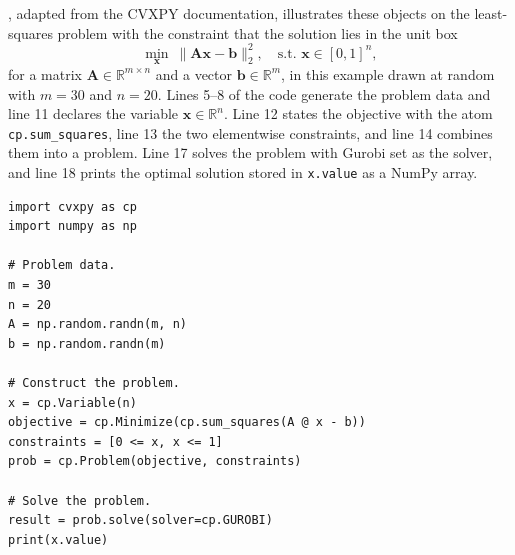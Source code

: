 , adapted from the CVXPY documentation, illustrates these objects on the least-squares
problem with the constraint that the solution lies in the unit box
\begin{equation*}
    \min_{\bm{x}} \ \|\bm{A}\bm{x} - \bm{b}\|_2^2, \quad \text{s.t. } \bm{x} \in [0,1]^n,
\end{equation*}
for a matrix $\bm{A} \in \mathbb{R}^{m \times n}$ and a vector $\bm{b} \in \mathbb{R}^m$, in this example drawn at random with
$m = 30$ and $n = 20$. Lines 5--8 of the code generate the problem data and line 11 declares the variable
$\bm{x} \in \mathbb{R}^n$. Line 12 states the objective with the atom \texttt{cp.sum\_squares}, line 13 the two
elementwise constraints, and line 14 combines them into a problem. Line 17 solves the problem with Gurobi set as the solver, and line 18 prints the 
optimal solution stored in \texttt{x.value} as a NumPy array. 

\begin{lstlisting}[style=python, caption={Least-squares problem with box constraints in CVXPY, adapted from the CVXPY documentation \cite{CVXPYDocs}.}, label={lst:cvxpy-least-squares}]
import cvxpy as cp
import numpy as np

# Problem data.
m = 30
n = 20
A = np.random.randn(m, n)
b = np.random.randn(m)

# Construct the problem.
x = cp.Variable(n)
objective = cp.Minimize(cp.sum_squares(A @ x - b))
constraints = [0 <= x, x <= 1]
prob = cp.Problem(objective, constraints)

# Solve the problem.
result = prob.solve(solver=cp.GUROBI)
print(x.value)
\end{lstlisting}

